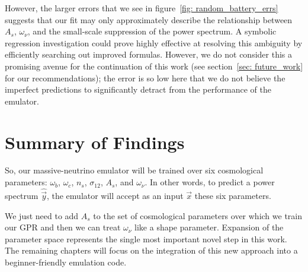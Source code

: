 However, the larger errors that we see in
figure~\ref{fig: random_battery_errs} suggests that our fit may only
approximately describe the relationship
between $A_s$, $\omega_\nu$, and the small-scale suppression of the power
spectrum. A symbolic regression investigation could prove highly effective at
resolving this ambiguity by efficiently searching out improved formulas. 
However, we do not consider this a promising avenue
for the continuation of this work (see section~\ref{sec: future_work} for our
recommendations); the error
is so low here that we do not believe the imperfect predictions to
significantly detract from the performance of the emulator.

\section{Summary of Findings}


So, our massive-neutrino emulator will be trained over six cosmological
parameters: $\omega_b$, $\omega_c$, $n_s$, $\sigma_{12}$, $A_s$, and
$\omega_\nu$. In other words, to predict a power
spectrum $\hat{\vec{y}}$, the emulator will accept as an input $\vec{x}$
these six parameters.


We just need to add $A_s$ to the set of cosmological parameters
over which we train our GPR and then we can treat $\omega_\nu$ like a shape
parameter. Expansion of the parameter space represents the single most 
important novel step in this work. The remaining chapters will
focus on the integration of this new approach into a beginner-friendly
emulation code.
